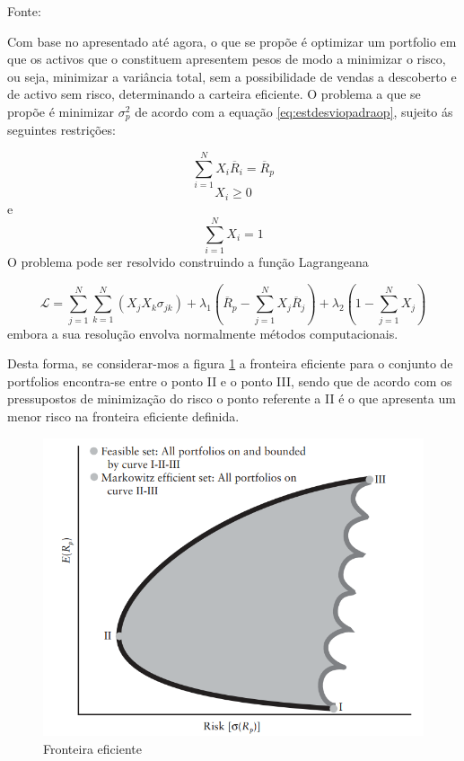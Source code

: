 \documentclass[
  12pt,
  a4paper,
  openany]{book}
\begin{document}
Fonte: \citep[pp.58]{Goetzmann2014}

\justifying
\bigskip

Com base no apresentado até agora, o que se propõe é optimizar um portfolio em que os activos que o constituem apresentem pesos de modo a minimizar o risco, ou seja, minimizar a variância total, sem a possibilidade de vendas a descoberto e de activo sem risco, determinando a carteira eficiente. O problema a que se propõe é minimizar \(\sigma_{p}^{2}\) de acordo com a equação \eqref{eq:estdesviopadraop}, sujeito ás seguintes restrições:

\begin{equation} 
  \sum_{i=1}^{N}X_{i}\overline{R}_{i}=\overline{R}_{p}
  \label{eq:und}
\end{equation}
\[X_{i}\geq0\] e \[\sum_{i=1}^{N}X_{i}=1\]
O problema pode ser resolvido construindo a função Lagrangeana

\begin{equation} 
  \mathcal{L} = \sum_{j=1}^{N}\sum_{k=1}^{N}(X_{j}X_{k}\sigma_{jk})+\lambda_{1}(\overline{R}_{p}-\sum_{j=1}^{N}X_{j}\overline{R}_{j})+\lambda_{2}(1-\sum_{j=1}^{N}X_{j})
  \label{eq:lagrangeana}
\end{equation}
embora a sua resolução envolva normalmente métodos computacionais.

Desta forma, se considerar-mos a figura \ref{fig:eficient} a fronteira eficiente para o conjunto de portfolios encontra-se entre o ponto II e o ponto III, sendo que de acordo com os pressupostos de minimização do risco o ponto referente a II é o que apresenta um menor risco na fronteira eficiente definida.



\begin{figure}

{\centering \includegraphics[width=0.6\linewidth]{image/eficient} 

}

\caption{Fronteira eficiente}\label{fig:eficient}
\end{figure}
\FloatBarrier
\centering
\end{document}
